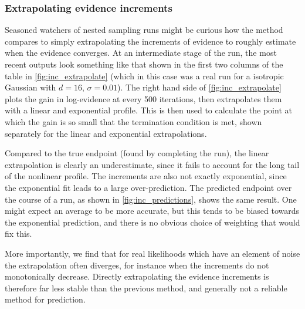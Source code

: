 \documentclass[usenatbib]{mnras}
\begin{document}
\subsubsection{Extrapolating evidence increments}
Seasoned watchers of nested sampling runs might be curious how the method compares to simply extrapolating the increments of evidence to roughly estimate when the evidence converges. At an intermediate stage of the run, the most recent outputs look something like that shown in the first two columns of the table in \cref{fig:inc_extrapolate} (which in this case was a real run for a isotropic Gaussian with $d = 16$, $\sigma = 0.01$). The right hand side of \cref{fig:inc_extrapolate} plots the gain in log-evidence at every 500 iterations, then extrapolates them with a linear and exponential profile. This is then used to calculate the point at which the gain is so small that the termination condition is met, shown separately for the linear and exponential extrapolations.
\par
Compared to the true endpoint (found by completing the run), the linear extrapolation is clearly an underestimate, since it fails to account for the long tail of the nonlinear profile. The increments are also not exactly exponential, since the exponential fit leads to a large over-prediction. The predicted endpoint over the course of a run, as shown in \cref{fig:inc_predictions}, shows the same result. One might expect an average to be more accurate, but this tends to be biased towards the exponential prediction, and there is no obvious choice of weighting that would fix this.
\par
More importantly, we find that for real likelihoods which have an element of noise the extrapolation often diverges, for instance when the increments do not monotonically decrease. Directly extrapolating the evidence increments is therefore far less stable than the previous method, and generally not a reliable method for prediction.
\end{document}

